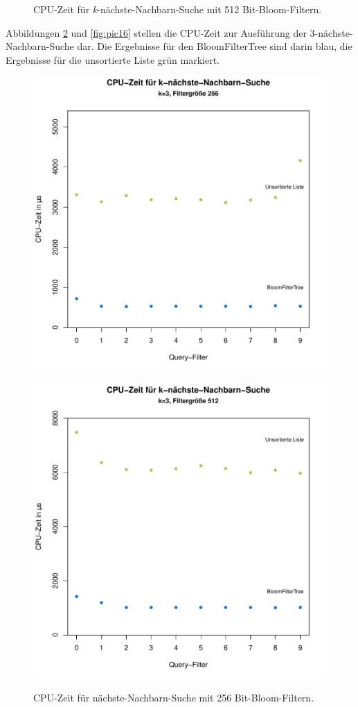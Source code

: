 \begin{figure}[hptb]
	\caption[CPU-Zeit für nächste-Nachbarn-Suche mit 512 Bit-Bloom-Filtern]{CPU-Zeit für \textit{k}-nächste-Nachbarn-Suche mit 512 Bit-Bloom-Filtern.}\label{fig:pic14}
\end{figure}
Abbildungen \ref{fig:pic15} und \ref{fig:pic16} stellen die CPU-Zeit zur Ausführung der 3-nächste-Nachbarn-Suche dar. Die Ergebnisse für den BloomFilterTree sind darin blau, die Ergebnisse für die unsortierte Liste grün markiert.  
\begin{figure}[hptb]
	\centering
	\includegraphics[scale=0.7]{pictures/cputime_nn3_256.pdf}\\
	\caption[CPU-Zeit für 3-nächste-Nachbarn-Suche mit 256 Bit-Bloom-Filtern]{CPU-Zeit für nächste-Nachbarn-Suche mit 256 Bit-Bloom-Filtern.}\label{fig:pic15}
	\includegraphics[scale=0.7]{pictures/cputime_nn3_512.pdf}\\

\end{figure}
